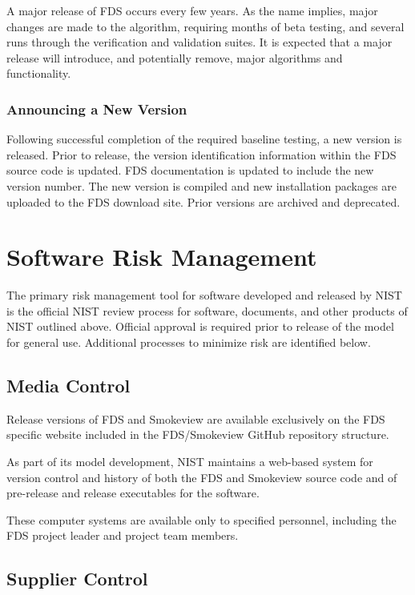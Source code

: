 \documentclass[11pt]{book}
\begin{document}
A major release of FDS occurs every few years. As the name implies, major changes are made to the algorithm, requiring months of beta testing, and several runs through the verification and validation suites. It is expected that a major release will introduce, and potentially remove, major algorithms and functionality.


\subsection{Announcing a New Version}

Following successful completion of the required baseline testing, a new version is released.  Prior to release, the version identification information within the FDS source code is updated.  FDS documentation is updated to include the new version number.  The new version is compiled and new installation packages are uploaded to the FDS download site.  Prior versions are archived and deprecated.



\chapter{Software Risk Management}

The primary risk management tool for software developed and released by NIST is the official NIST review process for software, documents, and other products of NIST outlined above. Official approval is required prior to release of the model for general use. Additional processes to minimize risk are identified below.

\section{Media Control}

Release versions of FDS and Smokeview are available exclusively on the FDS specific website included in the FDS/Smokeview GitHub repository structure.

As part of its model development, NIST maintains a web-based system for version control and history of both the FDS and Smokeview source code and of pre-release and release executables for the software.

These computer systems are available only to specified personnel, including the FDS project leader and project team members.

\section{Supplier Control}
\end{document}
